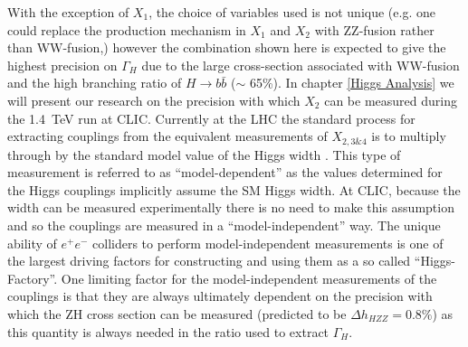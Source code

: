  With the exception of $X_1$, the choice of variables used is not unique (e.g. one could replace the production mechanism in $X_1$ and $X_2$ with ZZ-fusion rather than WW-fusion,) however the combination shown here is expected to give the highest precision on $\Gamma_H$ due to the large cross-section associated with WW-fusion and the high branching ratio of $H\rightarrow b\bar{b}$ ($\sim$ 65\%). In chapter \ref{Higgs Analysis} we will present our research on the precision with which $X_2$ can be measured during the 1.4~TeV run at CLIC. Currently at the LHC the standard process for extracting couplings from the equivalent measurements of $X_{2,3\&4}$ is to multiply through by the standard model value of the Higgs width \cite{ATLAS-CONF-2015-044}. This type of measurement is referred to as ``model-dependent'' as the values determined for the Higgs couplings implicitly assume the \ac{SM} Higgs width. At CLIC, because the width can be measured experimentally there is no need to make this assumption and so the couplings are measured in a ``model-independent'' way. The unique ability of $e^+e^-$ colliders to perform model-independent measurements is one of the largest driving factors for constructing and using them as a so called ``Higgs-Factory''. One limiting factor for the model-independent measurements of the couplings is that they are always ultimately dependent on the precision with which the ZH cross section can be measured (predicted to be $\Delta h_{HZZ} = 0.8\%$\cite{Abramowicz:2016zbo}) as this quantity is always needed in the ratio used to extract $\Gamma_H$.

